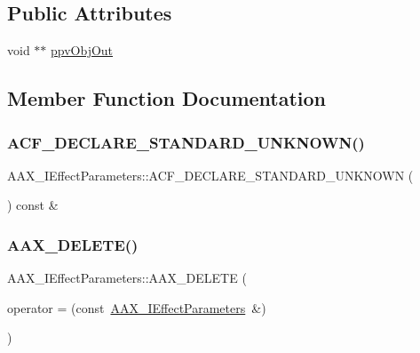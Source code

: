 \subsection*{Public Attributes}
\begin{DoxyCompactItemize}
\item 
void $\ast$$\ast$ \mbox{\hyperlink{a01825_ae2e7b2d7553902b3e8163e8d1ef640dc}{ppv\+Obj\+Out}}
\end{DoxyCompactItemize}


\subsection{Member Function Documentation}
\mbox{\label{a01825_a6be6ecdd9b96ca0d7723995e6dd4e478}} 
\subsubsection{\texorpdfstring{ACF\_DECLARE\_STANDARD\_UNKNOWN()}{ACF\_DECLARE\_STANDARD\_UNKNOWN()}}
{\footnotesize\ttfamily A\+A\+X\+\_\+\+I\+Effect\+Parameters\+::\+A\+C\+F\+\_\+\+D\+E\+C\+L\+A\+R\+E\+\_\+\+S\+T\+A\+N\+D\+A\+R\+D\+\_\+\+U\+N\+K\+N\+O\+WN (\begin{DoxyParamCaption}{ }\end{DoxyParamCaption}) const \&}

\mbox{\label{a01825_ac3fdd3463ee1eeef3fb4a47750f71511}} 
\subsubsection{\texorpdfstring{AAX\_DELETE()}{AAX\_DELETE()}}
{\footnotesize\ttfamily A\+A\+X\+\_\+\+I\+Effect\+Parameters\+::\+A\+A\+X\+\_\+\+D\+E\+L\+E\+TE (\begin{DoxyParamCaption}\item[{\mbox{\hyperlink{a01825}{A\+A\+X\+\_\+\+I\+Effect\+Parameters}} \&}]{operator = {\ttfamily (const~\mbox{\hyperlink{a01825}{A\+A\+X\+\_\+\+I\+Effect\+Parameters}}~\&)} }\end{DoxyParamCaption})}



